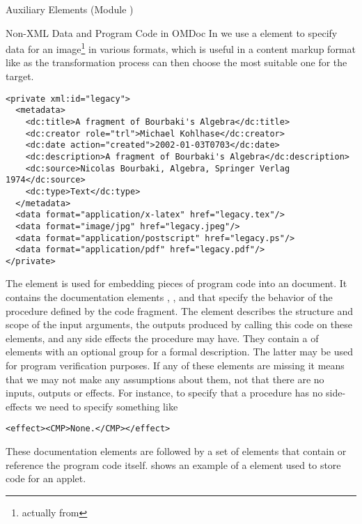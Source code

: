 \begin{tchapter}[id=ext,short=Auxiliary Elements]{Auxiliary Elements (Module {})}
\begin{tsection}[id=private]{Non-XML Data and Program Code in OMDoc}
In {} we use a {} element to specify data
for an image\footnote{actually {} from {}}
in various formats, which is useful in a content markup format like {\omdoc} as
the transformation process can then choose the most suitable one for the target.

\begin{lstlisting}[label=lst:private-fig,index={private,data},
  caption={A {\element{private}} Element for an Image}]
<private xml:id="legacy">
  <metadata>
    <dc:title>A fragment of Bourbaki's Algebra</dc:title>
    <dc:creator role="trl">Michael Kohlhase</dc:creator> 
    <dc:date action="created">2002-01-03T0703</dc:date>
    <dc:description>A fragment of Bourbaki's Algebra</dc:description>
    <dc:source>Nicolas Bourbaki, Algebra, Springer Verlag 1974</dc:source>
    <dc:type>Text</dc:type>
  </metadata>
  <data format="application/x-latex" href="legacy.tex"/>
  <data format="image/jpg" href="legacy.jpeg"/>
  <data format="application/postscript" href="legacy.ps"/>
  <data format="application/pdf" href="legacy.pdf"/>
</private>
\end{lstlisting}

The {} element is used for embedding pieces of program code into an {\omdoc}
document.  It contains the documentation elements {}, {}, and
{} that specify the behavior of the procedure defined by the code fragment.
The {} element describes the structure and scope of the input arguments,
{} the outputs produced by calling this code on these elements, and
{} any side effects the procedure may have.  They contain a
{} of {} elements with an optional
{} group for a formal description. The latter may be used for program
verification purposes. If any of these elements are missing it means that we may not make
any assumptions about them, not that there are no inputs, outputs or effects. For
instance, to specify that a procedure has no side-effects we need to specify something
like 
\begin{lstlisting}
<effect><CMP>None.</CMP></effect>
\end{lstlisting}

These documentation elements are followed by a set of {} elements
that contain or reference the program code itself. {} shows an
example of a {} element used to store {} code for an
applet.


\end{tsection}
\end{tchapter}
